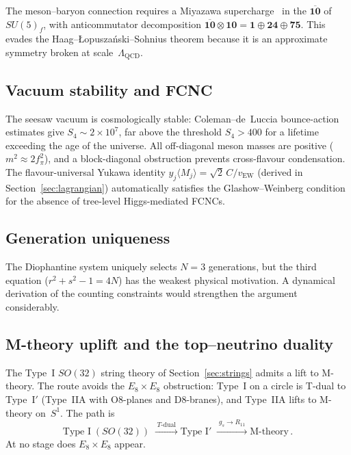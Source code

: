 \documentclass[12pt,a4paper]{article}
\newcommand{\fpi}{f_\pi}
\begin{document}
The meson--baryon connection requires a Miyazawa
supercharge~\cite{Miyazawa, CattoGursey} in the
$\overline{\mathbf{10}}$ of $SU(5)_f$, with anticommutator
decomposition
$\overline{\mathbf{10}}\otimes\mathbf{10}
  = \mathbf{1}\oplus\mathbf{24}\oplus\mathbf{75}$.
This evades the Haag--\L{}opusza\'nski--Sohnius theorem because
it is an approximate symmetry broken at scale~$\Lambda_{\text{QCD}}$.

\subsection{Vacuum stability and FCNC}

The seesaw vacuum is cosmologically stable:
Coleman--de~Luccia bounce-action estimates give
$S_4 \sim 2 \times 10^7$, far above the threshold
$S_4 > 400$ for a lifetime exceeding the age of the universe.
All off-diagonal meson masses are positive
($m^2 \approx 2\fpi^2$), and a block-diagonal obstruction
prevents cross-flavour condensation. The flavour-universal
Yukawa identity $y_j\langle M_j\rangle = \sqrt{2}\,C/v_{\text{EW}}$
(derived in Section~\ref{sec:lagrangian})
automatically satisfies the Glashow--Weinberg condition for the
absence of tree-level Higgs-mediated FCNCs.

\subsection{Generation uniqueness}
The Diophantine system uniquely selects $N = 3$ generations,
but the third equation ($r^2 + s^2 - 1 = 4N$) has the weakest
physical motivation. A dynamical derivation of the counting
constraints would strengthen the argument considerably.

\subsection{M-theory uplift and the top--neutrino duality}

The Type~I $SO(32)$ string theory of Section~\ref{sec:strings}
admits a lift to M-theory.  The route avoids the $E_8 \times E_8$
obstruction: Type~I on a circle is T-dual to Type~I$'$
(Type~IIA with O8-planes and D8-branes), and Type~IIA lifts to
M-theory on~$S^1$.  The path is
\begin{equation}
  \text{Type I}\;(SO(32))
  \;\xrightarrow{\;T\text{-dual}\;}
  \text{Type I}'
  \;\xrightarrow{\;g_s \to R_{11}\;}
  \text{M-theory}\,.
\end{equation}
At no stage does $E_8 \times E_8$ appear.
\end{document}
